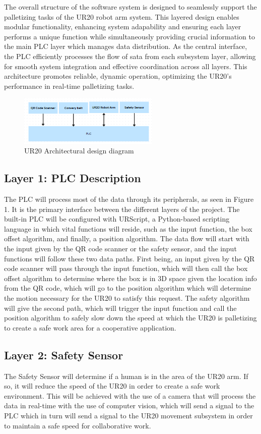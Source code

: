 The overall structure of the software system is designed to seamlessly support the palletizing tasks of the UR20 robot arm system. This layered design enables modular functionality, enhancing system adapability and ensuring each layer performs a unique function while simultaneously providing crucial information to the main PLC layer which manages data distribution. As the central interface, the PLC efficiently processes the flow of sata from each subsystem layer, allowing for smooth system integration and effective coordination across all layers. This architecture promotes reliable, dynamic operation, optimizing the UR20's performance in real-time palletizing tasks.
\begin{figure}[h!]
	\centering
 	\includegraphics[width=0.60\textwidth]{images/layers}
 \caption{UR20 Architectural design diagram}
\end{figure}

\subsection{Layer 1: PLC Description}
The PLC will process most of the data through its peripherals, as seen in Figure 1. It is the primary interface between the different layers of the project. The built-in PLC will be configured with URScript, a Python-based scripting language in which vital functions will reside, such as the input function, the box offset algorithm, and finally, a position algorithm. The data flow will start with the input given by the QR code scanner or the safety sensor, and the input functions will follow these two data paths. First being, an input given by the QR code scanner will pass through the input function, which will then call the box offset algorithm to determine where the box is in 3D space given the location info from the QR code, which will go to the position algorithm which will determine the motion necessary for the UR20 to satisfy this request. The safety algorithm will give the second path, which will trigger the input function and call the position algorithm to safely slow down the speed at which the UR20 is palletizing to create a safe work area for a cooperative application.

\subsection{Layer 2: Safety Sensor}
The Safety Sensor will determine if a human is in the area of the UR20 arm. If so, it will reduce the speed of the UR20 in order to create a safe work environment. This will be achieved with the use of a camera that will process the data in real-time with the use of computer vision, which will send a signal to the PLC which in turn will send a signal to the UR20 movement subsystem in order to maintain a safe speed for collaborative work.

